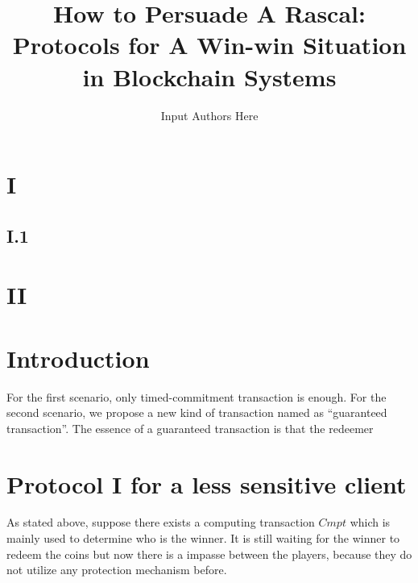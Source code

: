 \documentclass[10pt,twocolumn]{article}
\title{How to Persuade A Rascal: Protocols for A Win-win Situation in Blockchain Systems}
\author{Input Authors Here}
\date{}
\begin{document}
\maketitle

\section{I}


\subsection{I.1}

\section{II}

\section{Introduction}

For the first scenario, only timed-commitment transaction is enough. For the second scenario, we propose a new kind of transaction named as ``guaranteed transaction''. The essence of a guaranteed transaction is that the redeemer 

\section{Protocol I for a less sensitive client}

As stated above, suppose there exists a computing transaction $Cmpt$ which is mainly used to determine who is the winner. It is still waiting for the winner to redeem the coins but now there is a impasse between the players, because they do not utilize any protection mechanism before.





%
\end{document}
